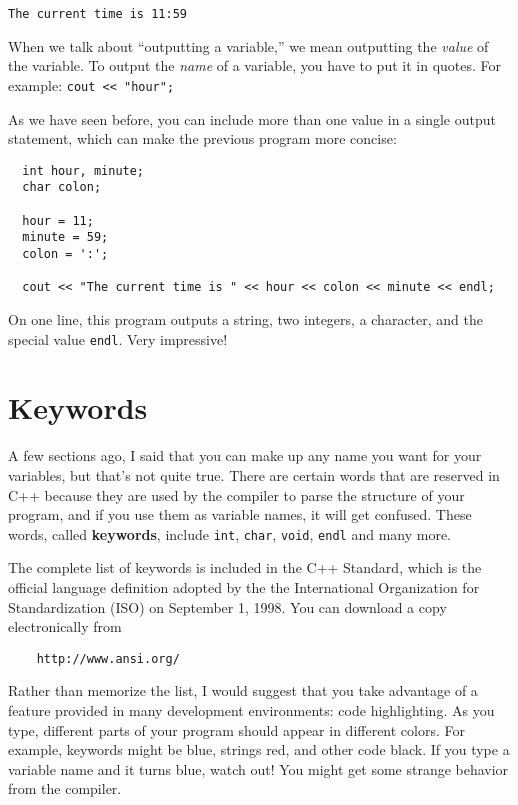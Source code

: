 \begin{verbatim}
The current time is 11:59
\end{verbatim}

When we talk about ``outputting a variable,'' we mean outputting the
{\em value} of the variable.  To output the {\em name} of a variable,
you have to put it in quotes.  For example: {\tt cout << "hour";}

As we have seen before, you can include more than one value in
a single output statement, which can make the previous program more
concise:

\begin{verbatim}
  int hour, minute;
  char colon;

  hour = 11;
  minute = 59;
  colon = ':';

  cout << "The current time is " << hour << colon << minute << endl;
\end{verbatim}
%
On one line, this program outputs a string, two integers, a character,
and the special value {\tt endl}.  Very impressive!

\section{Keywords}

A few sections ago, I said that you can make up any name you
want for your variables, but that's not quite true.  There
are certain words that are reserved in C++ because they are
used by the compiler to parse the structure of your program,
and if you use them as variable names, it will get confused.
These words, called {\bf keywords}, include {\tt int},
{\tt char}, {\tt void}, {\tt endl} and many more.

The complete list of keywords is included in the C++ Standard, which
is the official language definition adopted by the the International
Organization for Standardization (ISO) on September 1, 1998.  You
can download a copy electronically from

\begin{verbatim}
    http://www.ansi.org/
\end{verbatim}
%
Rather than memorize the list, I would suggest that you
take advantage of a feature provided in many development
environments: code highlighting.  As you type, different
parts of your program should appear in different colors.  For
example, keywords might be blue, strings red, and other code
black.  If you type a variable name and it turns blue, watch
out!  You might get some strange behavior from the compiler.

